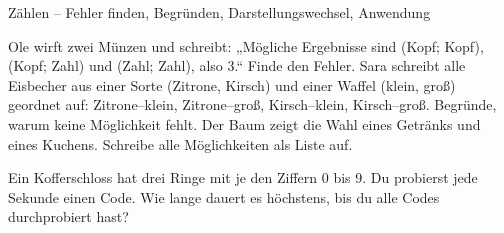 \begin{aufgabe}{Zählen – Fehler finden, Begründen, Darstellungswechsel, Anwendung}
\begin{teile}
\teil Ole wirft zwei Münzen und schreibt: „Mögliche Ergebnisse sind (Kopf; Kopf), (Kopf; Zahl) und (Zahl; Zahl), also 3.“ Finde den Fehler.
\teil Sara schreibt alle Eisbecher aus einer Sorte (Zitrone, Kirsch) und einer Waffel (klein, groß) geordnet auf: Zitrone–klein, Zitrone–groß, Kirsch–klein, Kirsch–groß. Begründe, warum keine Möglichkeit fehlt.
\teil Der Baum zeigt die Wahl eines Getränks und eines Kuchens. Schreibe alle Möglichkeiten als Liste auf.

\teil Ein Kofferschloss hat drei Ringe mit je den Ziffern 0 bis 9. Du probierst jede Sekunde einen Code. Wie lange dauert es höchstens, bis du alle Codes durchprobiert hast?
\end{teile}
\end{aufgabe}
